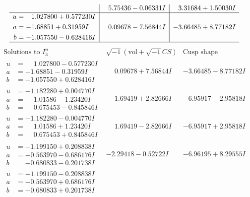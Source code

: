 \documentclass[1p]{elsarticle_modified}
\theoremstyle{definition}
\newcommand{\I}{\sqrt{-1}}
\begin{document}
$$\begin{array}{c|c|c}
 & \phantom{-}5.75436 - 0.06331 I & \phantom{-}3.31684 + 1.50030 I \\ \hline\begin{aligned}
u &= \phantom{-}1.027800 + 0.577230 I \\
a &= -1.68851 + 0.31959 I \\
b &= -1.057550 - 0.628416 I\end{aligned}
 & \phantom{-}0.09678 - 7.56844 I & -3.66485 + 8.77182 I\\
 \hline 
 \end{array}$$\newpage$$\begin{array}{c|c|c}  
\text{Solutions to }I^u_{3}& \I (\text{vol} + \sqrt{-1}CS) & \text{Cusp shape}\\
 \hline 
\begin{aligned}
u &= \phantom{-}1.027800 - 0.577230 I \\
a &= -1.68851 - 0.31959 I \\
b &= -1.057550 + 0.628416 I\end{aligned}
 & \phantom{-}0.09678 + 7.56844 I & -3.66485 - 8.77182 I \\ \hline\begin{aligned}
u &= -1.182280 + 0.004770 I \\
a &= \phantom{-}1.01586 - 1.23420 I \\
b &= \phantom{-}0.675453 - 0.845846 I\end{aligned}
 & \phantom{-}1.69419 + 2.82666 I & -6.95917 - 2.95818 I \\ \hline\begin{aligned}
u &= -1.182280 - 0.004770 I \\
a &= \phantom{-}1.01586 + 1.23420 I \\
b &= \phantom{-}0.675453 + 0.845846 I\end{aligned}
 & \phantom{-}1.69419 - 2.82666 I & -6.95917 + 2.95818 I \\ \hline\begin{aligned}
u &= -1.199150 + 0.208838 I \\
a &= -0.563970 - 0.686176 I \\
b &= -0.680833 - 0.201738 I\end{aligned}
 & -2.29418 - 0.52722 I & -6.96195 + 8.29555 I \\ \hline\begin{aligned}
u &= -1.199150 - 0.208838 I \\
a &= -0.563970 + 0.686176 I \\
b &= -0.680833 + 0.201738 I\end{aligned}

\end{array}$$
\end{document}
